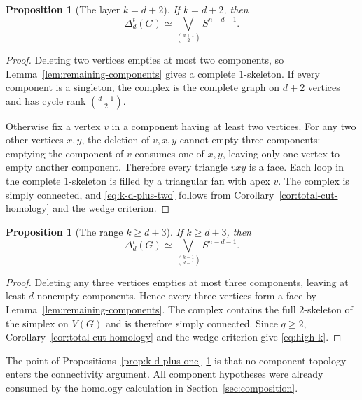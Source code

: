 \documentclass[11pt]{article}
\newtheorem{proposition}[theorem]{Proposition}
\theoremstyle{remark}
\numberwithin{equation}{section}
\begin{document}
\begin{proposition}[The layer $k=d+2$]\label{prop:k-d-plus-two}
If $k=d+2$, then
\begin{equation}
\Delta_d^t(G)\simeq
\bigvee_{\binom{d+1}{2}}S^{n-d-1}.
\label{eq:k-d-plus-two}
\end{equation}
\end{proposition}

\begin{proof}
Deleting two vertices empties at most two components, so
Lemma~\ref{lem:remaining-components} gives a complete $1$-skeleton. If every
component is a singleton, the complex is the complete graph on $d+2$ vertices
and has cycle rank $\binom{d+1}{2}$.

Otherwise fix a vertex $v$ in a component having at least two vertices. For
any two other vertices $x,y$, the deletion of $v,x,y$ cannot empty three
components: emptying the component of $v$ consumes one of $x,y$, leaving only
one vertex to empty another component. Therefore every triangle $vxy$ is a
face. Each loop in the complete $1$-skeleton is filled by a triangular fan
with apex $v$. The complex is simply connected, and
\eqref{eq:k-d-plus-two} follows from
Corollary~\ref{cor:total-cut-homology} and the wedge criterion.
\end{proof}

\begin{proposition}[The range $k\geq d+3$]\label{prop:high-k}
If $k\geq d+3$, then
\begin{equation}
\Delta_d^t(G)\simeq
\bigvee_{\binom{k-1}{d-1}}S^{n-d-1}.
\label{eq:high-k}
\end{equation}
\end{proposition}

\begin{proof}
Deleting any three vertices empties at most three components, leaving at least
$d$ nonempty components. Hence every three vertices form a face by
Lemma~\ref{lem:remaining-components}. The complex contains the full
$2$-skeleton of the simplex on $V(G)$ and is therefore simply connected. Since
$q\geq2$, Corollary~\ref{cor:total-cut-homology} and the wedge criterion give
\eqref{eq:high-k}.
\end{proof}

The point of Propositions~\ref{prop:k-d-plus-one}--\ref{prop:high-k} is that no
component topology enters the connectivity argument. All component hypotheses
were already consumed by the homology calculation in
Section~\ref{sec:composition}.
\end{document}
